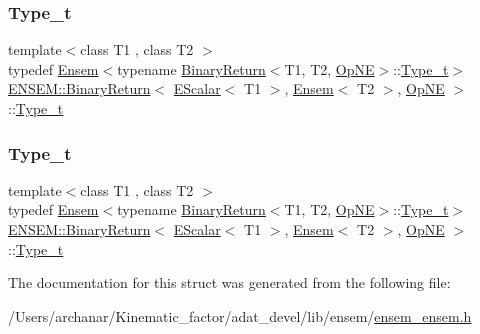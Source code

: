 \subsubsection{\texorpdfstring{Type\_t}{Type\_t}\hspace{0.1cm}{\footnotesize\ttfamily [1/2]}}
{\footnotesize\ttfamily template$<$class T1 , class T2 $>$ \\
typedef \mbox{\hyperlink{classENSEM_1_1Ensem}{Ensem}}$<$typename \mbox{\hyperlink{structENSEM_1_1BinaryReturn}{Binary\+Return}}$<$T1, T2, \mbox{\hyperlink{structENSEM_1_1OpNE}{Op\+NE}}$>$\+::\mbox{\hyperlink{structENSEM_1_1BinaryReturn_3_01EScalar_3_01T1_01_4_00_01Ensem_3_01T2_01_4_00_01OpNE_01_4_a8fb7ff2310962fd6cdec040f6eb7981b}{Type\+\_\+t}}$>$ \mbox{\hyperlink{structENSEM_1_1BinaryReturn}{E\+N\+S\+E\+M\+::\+Binary\+Return}}$<$ \mbox{\hyperlink{classENSEM_1_1EScalar}{E\+Scalar}}$<$ T1 $>$, \mbox{\hyperlink{classENSEM_1_1Ensem}{Ensem}}$<$ T2 $>$, \mbox{\hyperlink{structENSEM_1_1OpNE}{Op\+NE}} $>$\+::\mbox{\hyperlink{structENSEM_1_1BinaryReturn_3_01EScalar_3_01T1_01_4_00_01Ensem_3_01T2_01_4_00_01OpNE_01_4_a8fb7ff2310962fd6cdec040f6eb7981b}{Type\+\_\+t}}}

\mbox{\label{structENSEM_1_1BinaryReturn_3_01EScalar_3_01T1_01_4_00_01Ensem_3_01T2_01_4_00_01OpNE_01_4_a8fb7ff2310962fd6cdec040f6eb7981b}} 
\subsubsection{\texorpdfstring{Type\_t}{Type\_t}\hspace{0.1cm}{\footnotesize\ttfamily [2/2]}}
{\footnotesize\ttfamily template$<$class T1 , class T2 $>$ \\
typedef \mbox{\hyperlink{classENSEM_1_1Ensem}{Ensem}}$<$typename \mbox{\hyperlink{structENSEM_1_1BinaryReturn}{Binary\+Return}}$<$T1, T2, \mbox{\hyperlink{structENSEM_1_1OpNE}{Op\+NE}}$>$\+::\mbox{\hyperlink{structENSEM_1_1BinaryReturn_3_01EScalar_3_01T1_01_4_00_01Ensem_3_01T2_01_4_00_01OpNE_01_4_a8fb7ff2310962fd6cdec040f6eb7981b}{Type\+\_\+t}}$>$ \mbox{\hyperlink{structENSEM_1_1BinaryReturn}{E\+N\+S\+E\+M\+::\+Binary\+Return}}$<$ \mbox{\hyperlink{classENSEM_1_1EScalar}{E\+Scalar}}$<$ T1 $>$, \mbox{\hyperlink{classENSEM_1_1Ensem}{Ensem}}$<$ T2 $>$, \mbox{\hyperlink{structENSEM_1_1OpNE}{Op\+NE}} $>$\+::\mbox{\hyperlink{structENSEM_1_1BinaryReturn_3_01EScalar_3_01T1_01_4_00_01Ensem_3_01T2_01_4_00_01OpNE_01_4_a8fb7ff2310962fd6cdec040f6eb7981b}{Type\+\_\+t}}}



The documentation for this struct was generated from the following file\+:\begin{DoxyCompactItemize}
\item 
/\+Users/archanar/\+Kinematic\+\_\+factor/adat\+\_\+devel/lib/ensem/\mbox{\hyperlink{lib_2ensem_2ensem__ensem_8h}{ensem\+\_\+ensem.\+h}}\end{DoxyCompactItemize}
